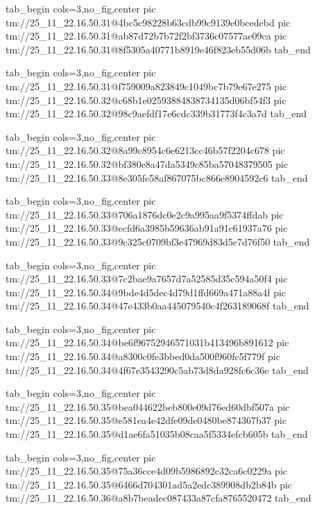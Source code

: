  
 
 
 
 

\qqSecCmtScr


\ifcmt
  tab_begin cols=3,no_fig,center
    pic tm://25_11_22.16.50.31@4bc5c98228b63cdb99c9139e0bcedebd
    pic tm://25_11_22.16.50.31@ab87d72b7b72f2bf3736c07577ae09ca
    pic tm://25_11_22.16.50.31@8f5305a40771b8919e46f823eb55d06b
  tab_end
\fi


\ifcmt
  tab_begin cols=3,no_fig,center
    pic tm://25_11_22.16.50.31@f759009a823849c1049bc7b79e67e275
    pic tm://25_11_22.16.50.32@c68b1e02593884838734135d06bf54f3
    pic tm://25_11_22.16.50.32@98c9aefdf17e6cdc339b31773f4c3a7d
  tab_end
\fi


\ifcmt
  tab_begin cols=3,no_fig,center
    pic tm://25_11_22.16.50.32@8a99c8954c6e6213cc46b57f2204c678
    pic tm://25_11_22.16.50.32@bf380e8a47da5349c85ba57048379505
    pic tm://25_11_22.16.50.33@8e305fe58af867075bc866e8904592c6
  tab_end
\fi


\ifcmt
  tab_begin cols=3,no_fig,center
    pic tm://25_11_22.16.50.33@706a1876dc0e2c9a995aa9f5374ffdab
    pic tm://25_11_22.16.50.33@ecfd6a3985b59636ab91a91c61937a76
    pic tm://25_11_22.16.50.33@9c325c0709bf3e47969d83d5e7d76f50
  tab_end
\fi


\ifcmt
  tab_begin cols=3,no_fig,center
    pic tm://25_11_22.16.50.33@7c2bae9a7657d7a52585d35c594a50f4
    pic tm://25_11_22.16.50.34@9bde4d5dec4d79d1ffd669a471a88a4f
    pic tm://25_11_22.16.50.34@47e433b0aa445079540c4f263189068f
  tab_end
\fi


\ifcmt
  tab_begin cols=3,no_fig,center
    pic tm://25_11_22.16.50.34@be6f96752946571031b413496b891612
    pic tm://25_11_22.16.50.34@a8300c0fe3bbed0da500f960fc5f779f
    pic tm://25_11_22.16.50.34@4f67e3543290c5ab73d8da928fc6c36e
  tab_end
\fi


\ifcmt
  tab_begin cols=3,no_fig,center
    pic tm://25_11_22.16.50.35@bea044622beb800e09d76ed60dbf507a
    pic tm://25_11_22.16.50.35@e581ea4e42dfe09de0480be874367b37
    pic tm://25_11_22.16.50.35@d1ae6fa51035b08caa5f5334efcb605b
  tab_end
\fi


\ifcmt
  tab_begin cols=3,no_fig,center
    pic tm://25_11_22.16.50.35@75a36cce4d09b5986892c32ca6c0229a
    pic tm://25_11_22.16.50.35@6466d704301ad5a2edc389908db2b84b
    pic tm://25_11_22.16.50.36@a8b7beadec087433a87cfa8765520472
  tab_end
\fi


